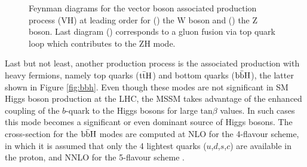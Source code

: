 \begin{figure}
\begin{subfigure}[b]{0.3\textwidth}
  \caption{\label{fig:vh3}}
\end{subfigure}
\caption{Feynman diagrams for the vector boson associated production process (VH) at leading order for () the W boson and () the Z boson. Last diagram () corresponds to a gluon fusion via top quark loop which contributes to the ZH mode.}
\label{fig:vh}
\end{figure}


Last but not least, another production process is the associated production with heavy fermions, namely top quarks ($\mathrm{t\Bar{t}H}$) and bottom quarks ($\mathrm{b\Bar{b}H}$), the latter shown in Figure \ref{fig:bbh}. Even though these modes are not significant in SM Higgs boson production at the LHC, the MSSM takes advantage of the enhanced coupling of the $b$-quark to the Higgs bosons for large $\mathrm{tan} \beta$ values. In such cases this mode becomes a significant or even dominant source of Higgs bosons. The cross-section for the $\mathrm{b\Bar{b}H}$ modes are computed at NLO for the 4-flavour scheme, in which it is assumed that only the 4 lightest quarks ($u$,$d$,$s$,$c$) are available in the proton, and NNLO for the 5-flavour scheme \cite{deFlorian:2227475}.


